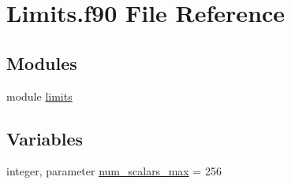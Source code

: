 \hypertarget{Limits_8f90}{}\section{Limits.\+f90 File Reference}
\label{Limits_8f90}
\subsection*{Modules}
\begin{DoxyCompactItemize}
\item 
module \hyperlink{namespacelimits}{limits}
\end{DoxyCompactItemize}
\subsection*{Variables}
\begin{DoxyCompactItemize}
\item 
integer, parameter \hyperlink{namespacelimits_aee7aa4dccb2ef9eeabd15a566b0f94e7}{num\+\_\+scalars\+\_\+max} = 256
\end{DoxyCompactItemize}
